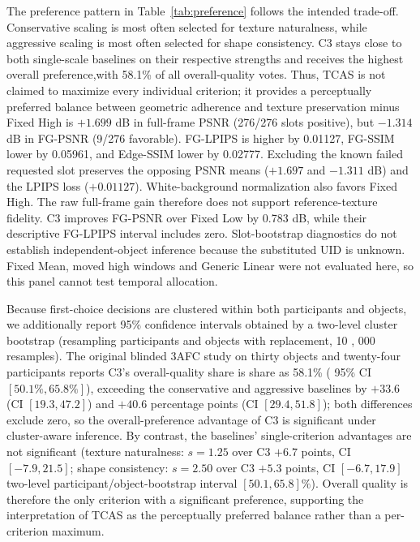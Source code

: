 \documentclass[times,twocolumn,final]{elsarticle}
\providecommand{\DIFadd}[1]{{\protect\color{blue} \sf #1}} %
\providecommand{\DIFdel}[1]{{\protect\color{red} \scriptsize #1}} %
\providecommand{\DIFaddbegin}{} %
\providecommand{\DIFaddend}{} %
\providecommand{\DIFdelbegin}{} %
\providecommand{\DIFdelend}{} %
\begin{document}
\DIFdelbegin \DIFdel{The preference pattern in Table~\ref{tab:preference} follows the intended trade-off. Conservative scaling is most often selected for texture naturalness, while aggressive scaling is most often selected for shape consistency.
}\DIFdelend C3 \DIFdelbegin \DIFdel{stays close to both single-scale baselines on their respective strengths and receives the highest overall preference,with 58.1\% of all overall-quality votes. Thus, TCAS is not claimed to maximize every individual criterion; it provides a perceptually preferred balance between geometric adherence and texture preservation}\DIFdelend \DIFaddbegin \DIFadd{minus Fixed High is $+1.699$ dB in full-frame PSNR (276/276 slots positive), but $-1.314$ dB in FG-PSNR (9/276 favorable). FG-LPIPS is higher by 0.01127, FG-SSIM lower by 0.05961, and Edge-SSIM lower by 0.02777. Excluding the known failed requested slot preserves the opposing PSNR means ($+1.697$ and $-1.311$ dB) and the LPIPS loss ($+0.01127$)}\DIFaddend . \DIFaddbegin \DIFadd{White-background normalization also favors Fixed High. The raw full-frame gain therefore does not support reference-texture fidelity. C3 improves FG-PSNR over Fixed Low by 0.783 dB, while their descriptive FG-LPIPS interval includes zero. Slot-bootstrap diagnostics do not establish independent-object inference because the substituted UID is unknown. Fixed Mean, moved high windows and Generic Linear were not evaluated here, so this panel cannot test temporal allocation.
}\DIFaddend 

\DIFdelbegin \DIFdel{Because first-choice decisions are clustered within both participants and objects, we additionally report 95\% confidence intervals obtained by a two-level cluster bootstrap (resampling participants and objects with replacement, 10}%
\DIFdel{, }%
\DIFdel{000 resamples). }\DIFdelend \DIFaddbegin \DIFadd{The original blinded 3AFC study on thirty objects and twenty-four participants reports }\DIFaddend C3's overall-quality \DIFdelbegin \DIFdel{share is }\DIFdelend \DIFaddbegin \DIFadd{share as }\DIFaddend 58.1\% (\DIFdelbegin \DIFdel{95\% CI $[50.1\%, 65.8\%]$), exceeding the conservative and aggressive baselines by $+33.6$ (CI $[19.3, 47.2]$) and $+40.6$ percentage points (CI $[29.4, 51.8]$); both differences exclude zero, so the overall-preference advantage of C3 is significant under cluster-aware inference. By contrast, the baselines' single-criterion advantages are not significant (texture naturalness: $s = 1.25$ over C3 $+6.7$ points, CI $[-7.9, 21.5]$; shape consistency: $s = 2.50$ over C3 $+5.3$ points, CI $[-6.7, 17.9]$}\DIFdelend \DIFaddbegin \DIFadd{two-level participant/object-bootstrap interval $[50.1,65.8]\%$}\DIFaddend ). \DIFdelbegin \DIFdel{Overall quality is therefore the only criterion with a significant preference, supporting the interpretation of TCAS as the perceptually preferred balance rather than a per-criterion maximum. }%
\end{document}
